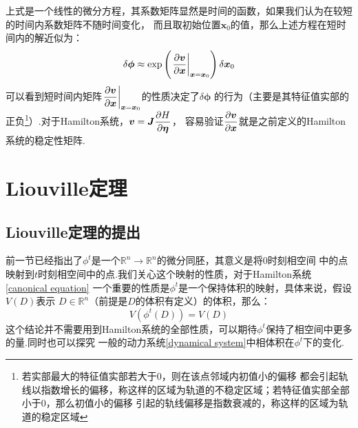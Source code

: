     上式是一个线性的微分方程，其系数矩阵显然是时间的函数，如果我们认为在较短的时间内系数矩阵不随时间变化，
    而且取初始位置$\bm{x}_0$的值，那么上述方程在短时间内的解近似为：
    \begin{equation}
        \delta \bm{\phi} \approx \exp\left(\left.\frac{\partial{\bm{v}}}{\partial{\bm{x}}}\right|_{\bm{x} = \bm{x}_0}\right) \delta\bm{x}_0
    \end{equation}
    可以看到短时间内矩阵$\displaystyle\left.\frac{\partial{\bm{v}}}{\partial{\bm{x}}}\right|_{\bm{x} = \bm{x}_0}$的性质决定了$\delta\bm{\phi}$
    的行为（主要是其特征值实部的正负\footnote{若实部最大的特征值实部若大于0，则在该点邻域内初值小的偏移
    都会引起轨线以指数增长的偏移，称这样的区域为轨道的不稳定区域；若特征值实部全部小于0，那么初值小的偏移
    引起的轨线偏移是指数衰减的，称这样的区域为轨道的稳定区域}）.对于Hamilton系统，$\displaystyle\bm{v} = \bm{J}\frac{\partial{H}}{\partial{\bm{\eta}}}$，
    容易验证$\displaystyle\frac{\partial{\bm{v}}}{\partial{\bm{x}}}$就是之前定义的Hamilton系统的稳定性矩阵.
    \section{Liouville定理}
    \subsection{Liouville定理的提出}
    前一节已经指出了$\phi^t$是一个$\mathbb{R}^n\to\mathbb{R}^n$的微分同胚，其意义是将0时刻相空间
    中的点映射到$t$时刻相空间中的点.我们关心这个映射的性质，对于Hamilton系统\ref{canonical equation}
    一个重要的性质是$\phi^t$是一个保持体积的映射，具体来说，假设$V(D)$表示
    $D\in\mathbb{R}^n$（前提是$D$的体积有定义）的体积，那么：
    \begin{equation}
        V(\phi^t(D)) = V(D)
    \end{equation}
    这个结论并不需要用到Hamilton系统的全部性质，可以期待$\phi^t$保持了相空间中更多的量.同时也可以探究
    一般的动力系统\ref{dynamical system}中相体积在$\phi^t$下的变化.
